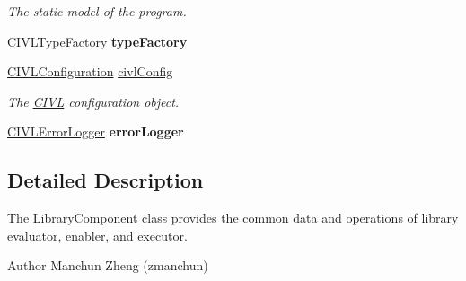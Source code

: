 \begin{DoxyCompactItemize}
\begin{DoxyCompactList}\small\item\em The static model of the program. \end{DoxyCompactList}\item 
\hypertarget{classedu_1_1udel_1_1cis_1_1vsl_1_1civl_1_1library_1_1common_1_1LibraryComponent_a31816429c874af2e0fa1224761c0de98}{}\hyperlink{interfaceedu_1_1udel_1_1cis_1_1vsl_1_1civl_1_1model_1_1IF_1_1CIVLTypeFactory}{C\+I\+V\+L\+Type\+Factory} {\bfseries type\+Factory}\label{classedu_1_1udel_1_1cis_1_1vsl_1_1civl_1_1library_1_1common_1_1LibraryComponent_a31816429c874af2e0fa1224761c0de98}

\item 
\hypertarget{classedu_1_1udel_1_1cis_1_1vsl_1_1civl_1_1library_1_1common_1_1LibraryComponent_a223e603cab7a909db88f49c256b2ce98}{}\hyperlink{classedu_1_1udel_1_1cis_1_1vsl_1_1civl_1_1config_1_1IF_1_1CIVLConfiguration}{C\+I\+V\+L\+Configuration} \hyperlink{classedu_1_1udel_1_1cis_1_1vsl_1_1civl_1_1library_1_1common_1_1LibraryComponent_a223e603cab7a909db88f49c256b2ce98}{civl\+Config}\label{classedu_1_1udel_1_1cis_1_1vsl_1_1civl_1_1library_1_1common_1_1LibraryComponent_a223e603cab7a909db88f49c256b2ce98}

\begin{DoxyCompactList}\small\item\em The \hyperlink{classedu_1_1udel_1_1cis_1_1vsl_1_1civl_1_1CIVL}{C\+I\+V\+L} configuration object. \end{DoxyCompactList}\item 
\hypertarget{classedu_1_1udel_1_1cis_1_1vsl_1_1civl_1_1library_1_1common_1_1LibraryComponent_ace012a5fe7ab66f158cf2123931c8d30}{}\hyperlink{classedu_1_1udel_1_1cis_1_1vsl_1_1civl_1_1log_1_1IF_1_1CIVLErrorLogger}{C\+I\+V\+L\+Error\+Logger} {\bfseries error\+Logger}\label{classedu_1_1udel_1_1cis_1_1vsl_1_1civl_1_1library_1_1common_1_1LibraryComponent_ace012a5fe7ab66f158cf2123931c8d30}

\end{DoxyCompactItemize}


\subsection{Detailed Description}
The \hyperlink{classedu_1_1udel_1_1cis_1_1vsl_1_1civl_1_1library_1_1common_1_1LibraryComponent}{Library\+Component} class provides the common data and operations of library evaluator, enabler, and executor. 

\begin{DoxyAuthor}{Author}
Manchun Zheng (zmanchun) 
\end{DoxyAuthor}


